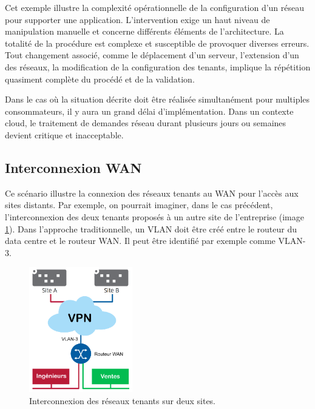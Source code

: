 Cet exemple illustre la complexité opérationnelle de la configuration d'un réseau pour supporter une application. L'intervention exige un haut niveau de manipulation manuelle et concerne différents éléments de l'architecture. La totalité de la procédure est complexe et susceptible de provoquer diverses erreurs. Tout changement associé, comme le déplacement d'un serveur, l'extension d'un des réseaux, la modification de la configuration des tenants, implique la répétition quasiment complète du procédé et de la validation.

Dans le cas où la situation décrite doit être réalisée simultanément pour multiples consommateurs, il y aura un grand délai d'implémentation. Dans un contexte cloud, le traitement de demandes réseau durant plusieurs jours ou semaines devient critique et inacceptable.  \cite{hpCloudEffectsOnNetworkLimitations} \cite{leveragingSDNCloudNetworkServiceExample} \cite{zkCloudArrived}


\subsection{Interconnexion WAN}

Ce scénario illustre la connexion des réseaux tenants au WAN pour l'accès aux sites distants. Par exemple, on pourrait imaginer, dans le cas précédent, l'interconnexion des deux tenants proposés à un autre site de l'entreprise (image \ref{InterconnexionWAN}). Dans l'approche traditionnelle, un VLAN doit être créé entre le routeur du data centre et le routeur WAN. Il peut être identifié par exemple comme VLAN-3.



\begin{figure}[h]
\begin{center}
\includegraphics[width=0.4\textwidth]{images/InterconnexionWAN_T} 
\caption{Interconnexion des réseaux tenants sur deux sites. \cite{leveragingSDNCloudDCWAN}} \label{InterconnexionWAN}
\end{center}
\end{figure} 


